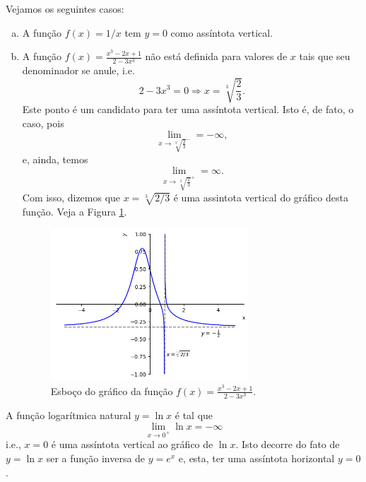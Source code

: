 \begin{ex}
  Vejamos os seguintes casos:
  \begin{enumerate}[a)]
  \item A função $f(x) = 1/x$ tem $y = 0$ como assíntota vertical.
  \item A função $\displaystyle f(x) = \frac{x^3 - 2x + 1}{2 - 3x^3}$ não está definida para valores de $x$ tais que seu denominador se anule, i.e.
    \begin{equation}
      2 - 3x^3 = 0 \Rightarrow x = \sqrt[3]{\frac{2}{3}}.
    \end{equation}
    Este ponto é um candidato para ter uma assíntota vertical. Isto é, de fato, o caso, pois
    \begin{equation}
      \lim_{x\to \sqrt[3]{\frac{2}{3}}^-} = -\infty, 
    \end{equation}
    e, ainda, temos
    \begin{equation}
      \lim_{x\to \sqrt[3]{\frac{2}{3}}^+} = \infty.
    \end{equation}
    Com isso, dizemos que $x = \sqrt[3]{2/3}$ é uma assintota vertical do gráfico desta função. Veja a Figura \ref{fig:ex_ass}.

    \begin{figure}[H]
      \centering
      \includegraphics[width=0.7\textwidth]{./cap_lim/dados/fig_ex_ass/fig_ex_ass}
      \caption{Esboço do gráfico da função $\displaystyle f(x) = \frac{x^3-2x+1}{2-3x^3}$.}
      \label{fig:ex_ass}
    \end{figure}
  \end{enumerate}
\end{ex}

\begin{ex}
  A função logarítmica natural $y = \ln x$ é tal que
  \begin{equation}
    \lim_{x\to 0^+} \ln x = -\infty
  \end{equation}
  i.e., $x=0$ é uma assíntota vertical ao gráfico de $\ln x$. Isto decorre do fato de $y = \ln x$ ser a função inversa de $y = e^x$ e, esta, ter uma assíntota horizontal $y=0$.
\end{ex}

